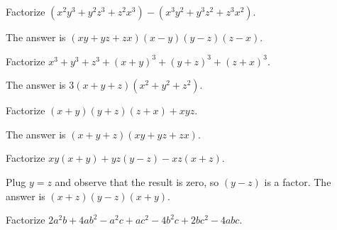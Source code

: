 \documentclass[12pt,a4paper]{memoir}
\theoremstyle{definition}
\begin{document}
\begin{tcolorbox}
	\begin{question}
		Factorize $(x^2y^3+y^2z^3+z^2x^3) - (x^3y^2+y^3z^2+z^3x^2)$.
	\end{question}
\end{tcolorbox}

\begin{solution}
	The answer is $(xy+yz+zx)(x-y)(y-z)(z-x)$.
\end{solution}

\begin{tcolorbox}
	\begin{question}
		Factorize $x^3+y^3+z^3+(x+y)^3+(y+z)^3+(z+x)^3$.
	\end{question}
\end{tcolorbox}

\begin{solution}
	The answer is $3(x+y+z)(x^2+y^2+z^2)$.
\end{solution}


\begin{tcolorbox}
	\begin{question}
		Factorize $(x+y)(y+z)(z+x)+xyz$.
	\end{question}
\end{tcolorbox}

\begin{solution}
	The answer is $(x+y+z)(xy+yz+zx)$.
\end{solution}


\begin{tcolorbox}
	\begin{question}
		Factorize $xy(x+y)+yz(y-z)-xz(x+z)$.
	\end{question}
\end{tcolorbox}

\begin{solution}[name=Solution by Parviz Shahriari]
	Plug $y=z$ and observe that the result is zero, so $(y-z)$ is a factor. The answer is $(x+z)(y-z)(x+y)$.
\end{solution}

\begin{tcolorbox}
	\begin{question}
		Factorize $2a^2b+4ab^2-a^2c+ac^2-4b^2c+2bc^2-4abc$.
	\end{question}
\end{tcolorbox}
\end{document}
